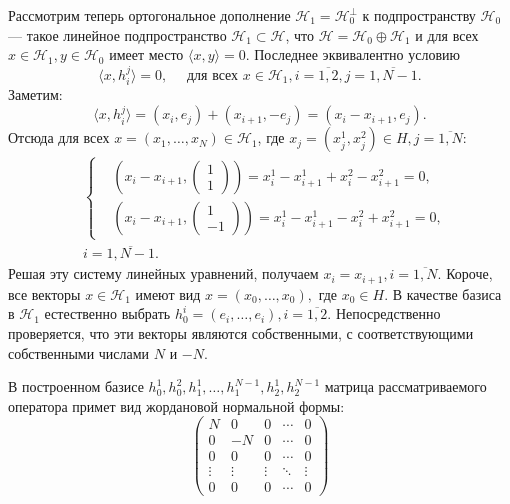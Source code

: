 \documentclass{article}
\begin{document}
Рассмотрим теперь ортогональное дополнение \( \mathcal{H}_1 = \mathcal{H}_0^{\perp} \) к подпространству \( \mathcal{H}_0 \)
--- такое линейное подпространство \( \mathcal{H}_1 \subset \mathcal{H} \),
что \( \mathcal{H} = \mathcal{H}_0 \oplus \mathcal{H}_1 \)
и для всех \( x\in\mathcal{H}_1, y\in\mathcal{H}_0 \) имеет место \( \langle x, y \rangle = 0 \).
Последнее эквивалентно условию
\[ \langle x,h_i^j \rangle = 0, \quad \text{ для всех } x\in\mathcal{H}_1, i=\overline{1,2}, j=\overline{1,N-1}. \]
Заметим:
\[ \langle x, h_i^j \rangle = (x_i, e_j) + (x_{i+1}, -e_j) = (x_i - x_{i+1}, e_j). \]
Отсюда для всех \( x = (x_1, \ldots, x_N) \in \mathcal{H}_1 \), где \( x_j = ( x_j^1, x_j^2 )\in H, j = \overline{1,N} \):
\begin{align*}
&   \left\{ \begin{aligned}
    & (x_i - x_{i+1}, \begin{pmatrix} 1 \\1 \end{pmatrix} )  = x_i^1 - x_{i+1}^1 + x_i^2 - x_{i+1}^2 = 0, \\
    & (x_i - x_{i+1}, \begin{pmatrix} 1 \\ -1\end{pmatrix} ) = x_i^1 - x_{i+1}^1 - x_i^2 + x_{i+1}^2 = 0,
    \end{aligned} \right. \\
&   i = \overline{1,N-1}. \end{align*}
Решая эту систему линейных уравнений, получаем \( x_i = x_{i+1}, i = \overline{1,N} \).
Короче, все векторы \( x\in \mathcal{H}_1 \) имеют вид \( x = (x_0, \ldots, x_0), \) где \( x_0\in H \).
В качестве базиса в \( \mathcal{H}_1 \) естественно выбрать \( h_0^i = (e_i, \ldots, e_i), i=\overline{1,2} \).
Непосредственно проверяется, что эти векторы являются собственными, с соответствующими собственными числами \( N \) и \( -N \).

В построенном базисе \( h_0^1, h_0^2, h_1^1, \ldots, h_1^{N-1} , h_2^1, h_2^{N-1} \)
матрица рассматриваемого оператора примет вид жордановой нормальной формы:
\[ \begin{pmatrix}
    N & 0  & 0 & \cdots & 0 \\
    0 & -N & 0 & \cdots & 0 \\
    0 & 0  & 0 & \cdots & 0 \\
    \vdots & \vdots & \vdots & \ddots & \vdots \\
    0 & 0  & 0 & \cdots & 0
    \end{pmatrix} \]
% 
\end{document}
